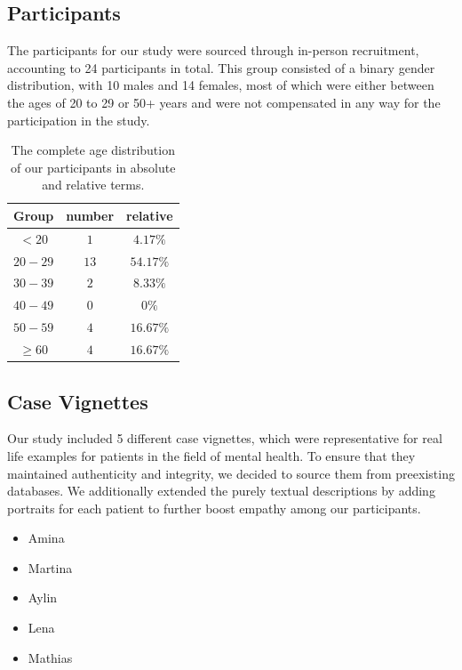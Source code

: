 \documentclass[sigconf,natbib=false]{acmart}
\begin{document}
\subsection{Participants}

The participants for our study were sourced through in-person recruitment, accounting to 24 participants in total. This group consisted of a binary gender distribution, with 10 males and 14 females, most of which were either between the ages of 20 to 29 or 50+ years and were not compensated in any way for the participation in the study.

\begin{table}[H]
    \centering
    \begin{tabular}{c|c|c}
         Group & number & relative \\
         \hline
         $<20$&$1$ &$4.17\%$\\
         $20-29$&$13$ &$54.17\%$\\
         $30-39$&$2$ &$8.33\%$\\
         $40-49$&$0$ &$0\%$\\
         $50-59$&$4$ &$16.67\%$\\
         $\geq 60$&$4$ &$16.67\%$\\
    \end{tabular}
    \caption{The complete age distribution of our participants in absolute and relative terms.}
    \label{tab:placeholder}
\end{table}

\subsection{Case Vignettes}

Our study included 5 different case vignettes, which were representative for real life examples for patients in the field of mental health. To ensure that they maintained authenticity and integrity, we decided to source them from preexisting databases. We additionally extended the purely textual descriptions by adding portraits for each patient to further boost empathy among our participants.

\begin{itemize}
    \item Amina \autocite[slide~8]{dbjr_stoerungsbilder}
    \item Martina \autocite[\#tab\_fallbeispiel]{theraphysia_mentale_gesundheit}
    \item Aylin \autocite[slide~15]{dbjr_stoerungsbilder}
    \item Lena \autocite[slide~26]{dbjr_stoerungsbilder}
    \item Mathias \autocite[p~1]{bar_fallbeispiel_psyche_psychosomatik}
\end{itemize}
\end{document}
